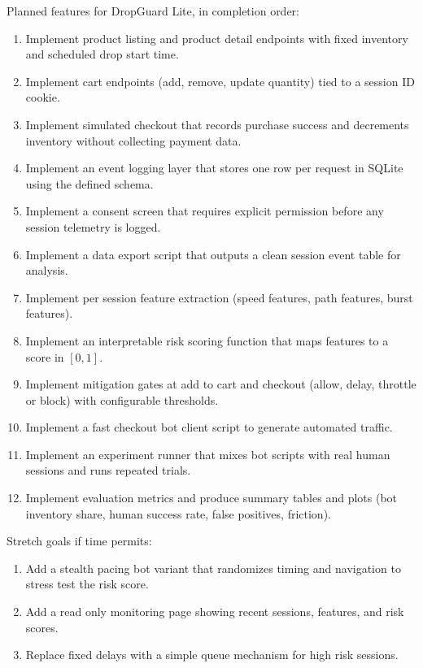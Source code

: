 \documentclass[12pt]{article}
\begin{document}
Planned features for DropGuard Lite, in completion order:

\begin{enumerate}
  \item Implement product listing and product detail endpoints with fixed inventory and scheduled drop start time.
  \item Implement cart endpoints (add, remove, update quantity) tied to a session ID cookie.
  \item Implement simulated checkout that records purchase success and decrements inventory without collecting payment data.
  \item Implement an event logging layer that stores one row per request in SQLite using the defined schema.
  \item Implement a consent screen that requires explicit permission before any session telemetry is logged.
  \item Implement a data export script that outputs a clean session event table for analysis.
  \item Implement per session feature extraction (speed features, path features, burst features).
  \item Implement an interpretable risk scoring function that maps features to a score in $[0,1]$.
  \item Implement mitigation gates at add to cart and checkout (allow, delay, throttle or block) with configurable thresholds.
  \item Implement a fast checkout bot client script to generate automated traffic.
  \item Implement an experiment runner that mixes bot scripts with real human sessions and runs repeated trials.
  \item Implement evaluation metrics and produce summary tables and plots (bot inventory share, human success rate, false positives, friction).
\end{enumerate}

Stretch goals if time permits:

\begin{enumerate}
  \item Add a stealth pacing bot variant that randomizes timing and navigation to stress test the risk score.
  \item Add a read only monitoring page showing recent sessions, features, and risk scores.
  \item Replace fixed delays with a simple queue mechanism for high risk sessions.
\end{enumerate}



\end{document}
